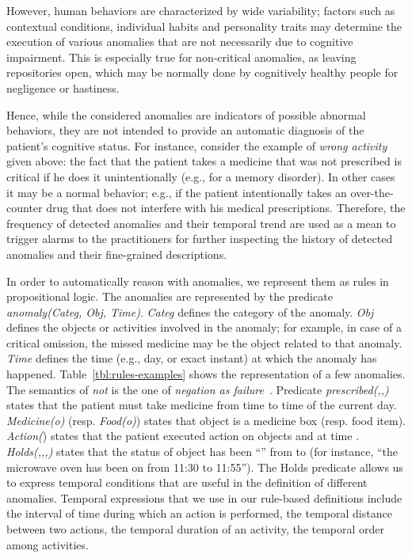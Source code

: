\documentclass[10pt, conference, compsocconf]{IEEEtran}
\begin{document}
However, human behaviors are characterized by wide variability; factors such as contextual 
conditions, individual habits and personality traits may determine the execution of 
various anomalies that are not necessarily due to cognitive impairment. This is especially true 
for non-critical anomalies, as leaving repositories open, which may be normally done 
by cognitively healthy people for negligence or hastiness. 

Hence, while the considered anomalies are indicators of possible abnormal behaviors, 
they are not intended to provide an automatic diagnosis of the patient's cognitive status. 
For instance, consider the example of \emph{wrong activity} given above: the fact that
the patient takes a medicine that was not prescribed is critical if he does it
unintentionally (e.g., for a memory disorder). In other cases it may be a normal 
behavior; e.g., if the patient intentionally takes an over-the-counter drug that does 
not interfere with his medical prescriptions. 
Therefore, the frequency of detected anomalies and their temporal trend are 
used as a mean to trigger alarms to the practitioners for further inspecting
the history of detected anomalies and their fine-grained descriptions. 

In order to automatically reason with anomalies, we represent them as rules in propositional logic. 
The anomalies are represented by the predicate \emph{anomaly(Categ, Obj, Time)}. 
\emph{Categ} defines the category of the anomaly.
\emph{Obj} defines the objects or activities involved in the anomaly; for example, in case of a critical omission, the missed medicine may be the object related to that anomaly. \emph{Time} defines the time (e.g., day, or exact instant) at which the anomaly has happened. 
Table~\ref{tbl:rules-examples} shows the representation of a few anomalies. 
The semantics of \emph{not} is the one of \emph{negation as failure}~\cite{russell}.
Predicate \emph{prescribed(,,)} states that the patient must take medicine 
 from time  to time  of the current day.
\emph{Medicine(o)} (resp. \emph{Food(o)}) states that object  is a medicine box (resp. 
food item). \emph{Action(}) states that the
patient executed action  on objects  and  at time . 
\emph{Holds(,,,)} states that the status of object  has been ``'' 
from  to  (for instance, ``the microwave oven has been on from 11:30 to 11:55'').
The Holds predicate allows us to express temporal conditions that are useful in the 
definition of different anomalies. Temporal expressions that we use in our rule-based 
definitions include the interval of time during which an action is performed, the temporal 
distance between two actions, the temporal duration of an activity, the temporal order
among activities.
\end{document}

